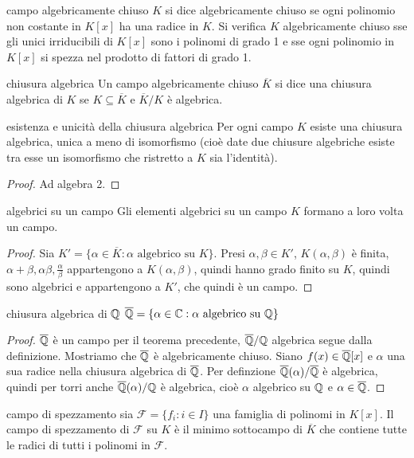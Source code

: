 \begin{definition}{campo algebricamente chiuso}
    $K$ si dice algebricamente chiuso se ogni polinomio non costante in $K[x]$ ha una radice in $K$. Si verifica $K$ algebricamente chiuso sse gli unici irriducibili di $K[x]$ sono i polinomi di grado 1 e sse ogni polinomio in $K[x]$ si spezza nel prodotto di fattori di grado 1.
\end{definition}
\begin{definition}{chiusura algebrica}
    Un campo algebricamente chiuso $\overline K$ si dice una chiusura algebrica di $K$ se $K \subseteq \overline K$ e $\overline K/K$ è algebrica.
\end{definition}
\begin{theorem}{esistenza e unicità della chiusura algebrica}
    Per ogni campo $K$ esiste una chiusura algebrica, unica a meno di isomorfismo (cioè date due chiusure algebriche esiste tra esse un isomorfismo che ristretto a $K$ sia l'identità).
\end{theorem}
\begin{proof}
    Ad algebra 2.
\end{proof}
\begin{theorem}{algebrici su un campo}
     Gli elementi algebrici su un campo $K$ formano a loro volta un campo.
\end{theorem}
\begin{proof}
    Sia $K' = \{ \alpha \in \overline K : \alpha \text{ algebrico su } K\}$. Presi $\alpha, \beta \in K'$, $K(\alpha, \beta)$ è finita, $\alpha + \beta, \alpha\beta, \frac{\alpha}{\beta}$ appartengono a $K(\alpha, \beta)$, quindi hanno grado finito su $K$, quindi sono algebrici e appartengono a $K'$, che quindi è un campo.
\end{proof}
\begin{theorem}{chiusura algebrica di $\mathbb{Q}$}
    $\overline{\mathbb{Q}} = \{ \alpha \in \mathbb{C} : \alpha \text{ algebrico su } \mathbb{Q}\}$
\end{theorem}
\begin{proof}
    $\overline{\mathbb{Q}}$ è un campo per il teorema precedente, $\overline{\mathbb{Q}}/\mathbb{Q}$ algebrica segue dalla definizione. Mostriamo che $\overline {\mathbb{Q}}$ è algebricamente chiuso. Siano $f(x) \in \overline{\mathbb{Q}}[x]$ e $\alpha$ una sua radice nella chiusura algebrica di $\overline{\mathbb{Q}}$. Per definzione $\overline{\mathbb{Q}}(\alpha)/\overline{\mathbb{Q}}$ è algebrica, quindi per torri anche $\overline{\mathbb{Q}}(\alpha) / \mathbb{Q}$ è algebrica, cioè $\alpha$ algebrico su $\mathbb{Q}$ e $\alpha \in \overline{\mathbb{Q}}$.
\end{proof}
\begin{definition}{campo di spezzamento}
    sia $\mathscr{F} = \{f_i : i \in I\}$ una famiglia di polinomi in $K[x]$. Il campo di spezzamento di $\mathscr{F}$ su $K$ è il minimo sottocampo di $\overline{K}$ che contiene tutte le radici di tutti i polinomi in $\mathscr{F}$.
\end{definition}

